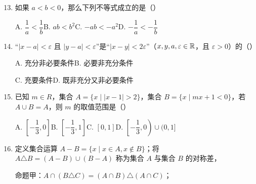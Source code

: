 \documentclass[a4paper,11pt]{article}
\begin{document}
\begin{enumerate}
\setcounter{enumi}{12}

\item 如果 $a<b<0$，那么下列不等式成立的是\mbox{（\quad）}

\keepwithprev
A. $\dfrac1a<\dfrac1b$\qquad B. $ab<b^2$\qquad C. $-ab<-a^2$\qquad D. $-\dfrac1a<-\dfrac1b$

\ifanswer
{}
\fi

\item “$\lvert x-a\rvert<\varepsilon$ 且 $\lvert y-a\rvert<\varepsilon$”是“$\lvert x-y\rvert<2\varepsilon$”（$x,y,a,\varepsilon\in\mathbb{R}$，且 $\varepsilon>0$）的\mbox{（\quad）}

\keepwithprev
A. 充分非必要条件\qquad B. 必要非充分条件

C. 充要条件\qquad D. 既非充分又非必要条件

\ifanswer
\solbegin
{}
\solend
\fi

\item 已知 $m\in R$，集合 $A=\{x\mid\lvert x-1\rvert>2\}$，集合 $B=\{x\mid mx+1<0\}$，若 $A\cup B=A$，则 $m$ 的取值范围是\mbox{（\quad）}

\keepwithprev
A. $\left[-\dfrac13,0\right]$\qquad B. $\left[-\dfrac13,1\right]$\qquad C. $[0,1]$\qquad D. $\left[-\dfrac13,0\right)\cup(0,1]$

\ifanswer
\solbegin
{}
\solend
\fi

\item 定义集合运算 $A-B=\{x\mid x\in A,x\notin B\}$；将 $A\triangle B=(A-B)\cup(B-A)$ 称为集合 $A$ 与集合 $B$ 的对称差，

命题甲：$A\cap(B\triangle C)=(A\cap B)\triangle(A\cap C)$；


\end{enumerate}
\end{document}
